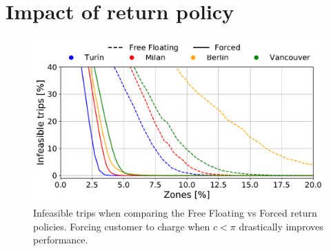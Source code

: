 \section{Impact of return policy}
\label{sec:6_7_results}

\begin{figure}[t!]
    \begin{center}
            \includegraphics[width=0.95\columnwidth]{figures/DeathsVsZones_city.pdf}
         \caption{Infeasible trips when comparing the Free Floating vs Forced return policies. Forcing customer to charge when $c<\pi$ drastically improves performance.}
         \label{fig:6_7_zone_vs_deaths_FF_N}
\end{center}
\end{figure}




